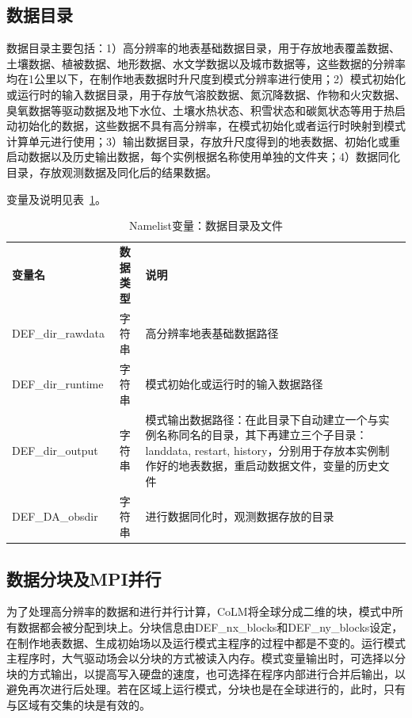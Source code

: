 \documentclass[a4paper,12pt,twoside]{article}
\begin{document}
\subsection{数据目录}

数据目录主要包括：1）高分辨率的地表基础数据目录，用于存放地表覆盖数据、土壤数据、植被数据、地形数据、水文学数据以及城市数据等，这些数据的分辨率均在1公里以下，在制作地表数据时升尺度到模式分辨率进行使用；2）模式初始化或运行时的输入数据目录，用于存放气溶胶数据、氮沉降数据、作物和火灾数据、臭氧数据等驱动数据及地下水位、土壤水热状态、积雪状态和碳氮状态等用于热启动初始化的数据，这些数据不具有高分辨率，在模式初始化或者运行时映射到模式计算单元进行使用；3）输出数据目录，存放升尺度得到的地表数据、初始化或重启动数据以及历史输出数据，每个实例根据名称使用单独的文件夹；4）数据同化目录，存放观测数据及同化后的结果数据。

变量及说明见表~\ref{table_nl_dir_file}。

\begin{table}[!htbp] \small
\caption{Namelist变量：数据目录及文件} \label{table_nl_dir_file}
\centering \renewcommand{\arraystretch}{1.2}
\begin{tabular}{lcp{}}
\toprule
\textbf{变量名} & \textbf{数据类型} & \textbf{说明} \\
DEF\_dir\_rawdata & 字符串 & 高分辨率地表基础数据路径 \\
DEF\_dir\_runtime & 字符串 & 模式初始化或运行时的输入数据路径 \\
DEF\_dir\_output & 字符串 & 模式输出数据路径：在此目录下自动建立一个与实例名称同名的目录，其下再建立三个子目录：landdata, restart, history，分别用于存放本实例制作好的地表数据，重启动数据文件，变量的历史文件 \\
DEF\_DA\_obsdir & 字符串 & 进行数据同化时，观测数据存放的目录 \\
\bottomrule
\end{tabular} 
\end{table}

\subsection{数据分块及MPI并行}

为了处理高分辨率的数据和进行并行计算，CoLM将全球分成二维的块，模式中所有数据都会被分配到块上。分块信息由DEF\_nx\_blocks和DEF\_ny\_blocks设定，在制作地表数据、生成初始场以及运行模式主程序的过程中都是不变的。运行模式主程序时，大气驱动场会以分块的方式被读入内存。模式变量输出时，可选择以分块的方式输出，以提高写入硬盘的速度，也可选择在程序内部进行合并后输出，以避免再次进行后处理。若在区域上运行模式，分块也是在全球进行的，此时，只有与区域有交集的块是有效的。
\end{document}
